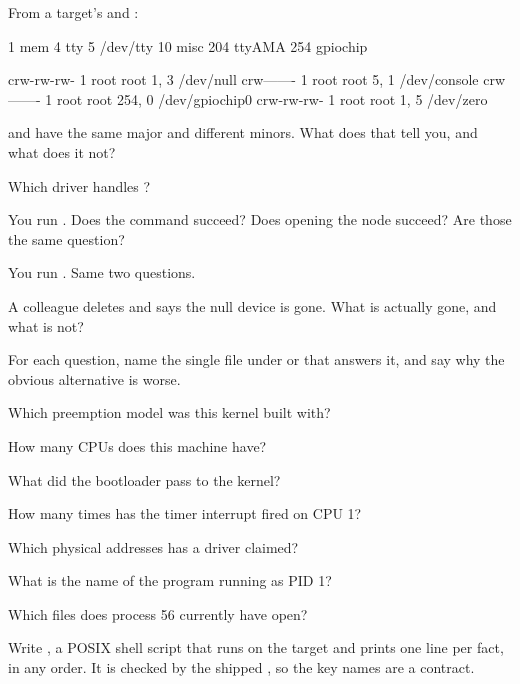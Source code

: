 From a target's  and :

\begin{console}
  1 mem
  4 tty
  5 /dev/tty
 10 misc
204 ttyAMA
254 gpiochip

crw-rw-rw-    1 root root    1,   3 /dev/null
crw-------    1 root root    5,   1 /dev/console
crw-------    1 root root  254,   0 /dev/gpiochip0
crw-rw-rw-    1 root root    1,   5 /dev/zero
\end{console}

  and  have the same major and different minors. What does
that tell you, and what does it not?

 Which driver handles ?

 You run . Does the command succeed? Does opening the node
succeed? Are those the same question?

 You run . Same two questions.

 A colleague deletes  and says the null device is gone. What is actually
gone, and what is not?

\label{c2:ex:5}

For each question, name the single file under  or  that answers it, and say
why the obvious alternative is worse.

 Which preemption model was this kernel built with?

 How many CPUs does this machine have?

 What did the bootloader pass to the kernel?

 How many times has the timer interrupt fired on CPU 1?

 Which physical addresses has a driver claimed?

 What is the name of the program running as PID 1?

 Which files does process 56 currently have open?

\label{c2:ex:6}

Write , a POSIX shell script that runs on the target and
prints one  line per fact, in any order. It is checked by the shipped
, so the key names are a contract.

